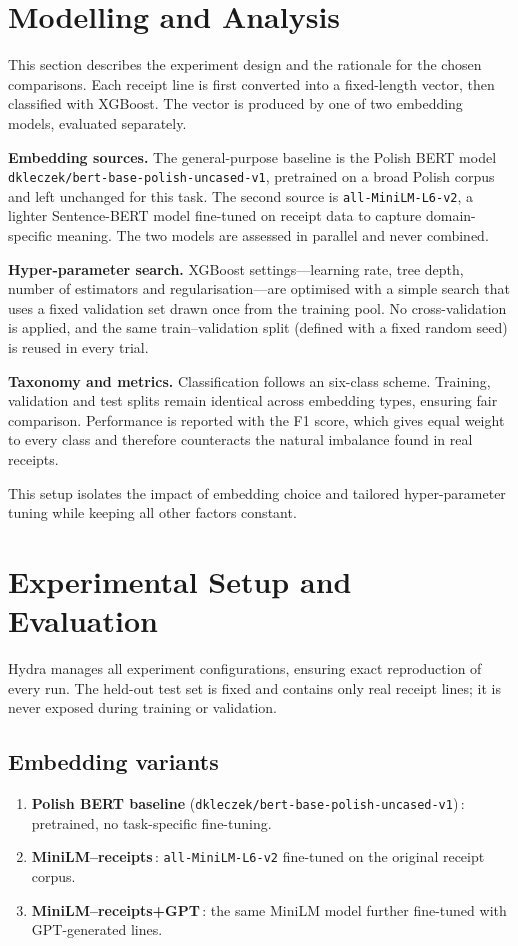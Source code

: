 \documentclass{SGGW-thesis-EN}
\begin{document}
\section{Modelling and Analysis}
This section describes the experiment design and the rationale for the chosen comparisons. Each receipt line is first
converted into a fixed-length vector, then classified with XGBoost. The vector is produced by one of two embedding
models, evaluated separately.

\textbf{Embedding sources.} The general-purpose baseline is the Polish BERT model
\texttt{dkleczek/bert-base-polish-uncased-v1}, pretrained on a broad Polish corpus and left unchanged for this task. The
second source is \texttt{all-MiniLM-L6-v2}, a lighter Sentence-BERT model fine-tuned on receipt data to capture
domain-specific meaning. The two models are assessed in parallel and never combined.

\textbf{Hyper-parameter search.} XGBoost settings—learning rate, tree depth, number of estimators and regularisation—are
optimised with a simple search that uses a fixed validation set drawn once from the training pool. No cross-validation
is applied, and the same train–validation split (defined with a fixed random seed) is reused in every trial.

\textbf{Taxonomy and metrics.} Classification follows an six-class scheme. Training, validation and test splits remain
identical across embedding types, ensuring fair comparison. Performance is reported with the
F1 score, which gives equal weight to every class and therefore counteracts the natural imbalance found
in real receipts.

This setup isolates the impact of embedding choice and tailored hyper-parameter tuning while keeping all other factors
constant.

\section{Experimental Setup and Evaluation}
Hydra manages all experiment configurations, ensuring exact reproduction of every run. The held-out test set is fixed
and contains only real receipt lines; it is never exposed during training or validation.

\subsection*{Embedding variants}
\begin{enumerate}
  \item \textbf{Polish BERT baseline} (\texttt{dkleczek/bert-base-polish-uncased-v1})\,: pretrained, no task-specific
        fine-tuning.
  \item \textbf{MiniLM–receipts}\,: \texttt{all-MiniLM-L6-v2} fine-tuned on the original receipt corpus.
  \item \textbf{MiniLM–receipts+GPT}\,: the same MiniLM model further fine-tuned with GPT-generated lines.
\end{enumerate}
\end{document}
